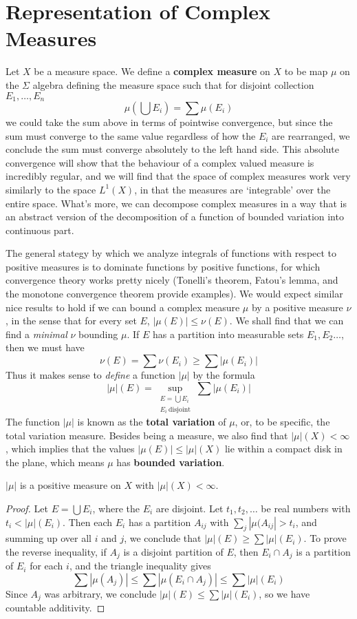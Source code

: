 \section{Representation of Complex Measures}

Let $X$ be a measure space. We define a {\bf complex measure} on $X$ to be map $\mu$ on the $\Sigma$ algebra defining the measure space such that for disjoint collection $E_1, \dots, E_n$
%
\[ \mu \left( \bigcup E_i \right) = \sum \mu(E_i) \]
%
we could take the sum above in terms of pointwise convergence, but since the sum must converge to the same value regardless of how the $E_i$ are rearranged, we conclude the sum must converge absolutely to the left hand side. This absolute convergence will show that the behaviour of a complex valued measure is incredibly regular, and we will find that the space of complex measures work very similarly to the space $L^1(X)$, in that the measures are `integrable' over the entire space. What's more, we can decompose complex measures in a way that is an abstract version of the decomposition of a function of bounded variation into continuous part.

The general stategy by which we analyze integrals of functions with respect to positive measures is to dominate functions by positive functions, for which convergence theory works pretty nicely (Tonelli's theorem, Fatou's lemma, and the monotone convergence theorem provide examples). We would expect similar nice results to hold if we can bound a complex measure $\mu$ by a positive measure $\nu$, in the sense that for every set $E$, $|\mu(E)| \leq \nu(E)$. We shall find that we can find a {\it minimal} $\nu$ bounding $\mu$. If $E$ has a partition into measurable sets $E_1, E_2 \dots$, then we must have
%
\[ \nu(E) = \sum \nu(E_i) \geq \sum |\mu(E_i)| \]
%
Thus it makes sense to {\it define} a function $|\mu|$ by the formula
%
\[ |\mu|(E) = \sup_{\substack{E = \bigcup E_i\\E_i\ \text{disjoint}}} \sum |\mu(E_i)| \]
%
The function $|\mu|$ is known as the {\bf total variation} of $\mu$, or, to be specific, the total variation measure. Besides being a measure, we also find that $|\mu|(X) < \infty$, which implies that the values $|\mu(E)| \leq |\mu|(X)$ lie within a compact disk in the plane, which means $\mu$ has {\bf bounded variation}.

\begin{theorem}
    $|\mu|$ is a positive measure on $X$ with $|\mu|(X) < \infty$.
\end{theorem}
\begin{proof}
    Let $E = \bigcup E_i$, where the $E_i$ are disjoint. Let $t_1, t_2, \dots$ be real numbers with $t_i < |\mu|(E_i)$. Then each $E_i$ has a partition $A_{ij}$ with $\sum_j |\mu(A_{ij}| > t_i$, and summing up over all $i$ and $j$, we conclude that $|\mu|(E) \geq \sum |\mu|(E_i)$. To prove the reverse inequality, if $A_j$ is a disjoint partition of $E$, then $E_i \cap A_j$ is a partition of $E_i$ for each $i$, and the triangle inequality gives
    \[ \sum |\mu(A_j)| \leq \sum |\mu(E_i \cap A_j)| \leq \sum |\mu|(E_i) \]
    Since $A_j$ was arbitrary, we conclude $|\mu|(E) \leq \sum |\mu|(E_i)$, so we have countable additivity.
\end{proof}

